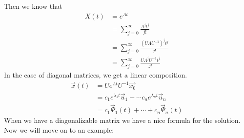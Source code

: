 \documentclass{article}
\theoremstyle{definition}
\begin{document}
        Then we know that 
        \begin{align}
            X(t) &= e^{At} \\
            &= \sum_{j=0}^\infty \frac{A^jt^j}{j!}\\
            &= \sum_{j=0}^\infty \frac{(U\Lambda U^{-1})^jt^j}{j!} \\
            &= \sum_{j=0}^\infty \frac{U\Lambda^j U^{-1}t^j}{j!}
        \end{align}
        In the case of diagonal matrices, we get a linear composition.
        \begin{align*}
            \vec x(t) &= Ue^{\Lambda t}U^{-1}\vec{x_0}\\
            &= c_1 e^{\lambda_1 t}\vec u_1 + \cdots c_n e^{\lambda_n t}\vec u_n \\
            &= c_1 \vec \Psi_1(t) + \cdots + c_n \vec \Psi_n(t)
        \end{align*}
        When we have a diagonalizable matrix we have a nice formula for the solution.
        Now we will move on to an example:
\end{document}
